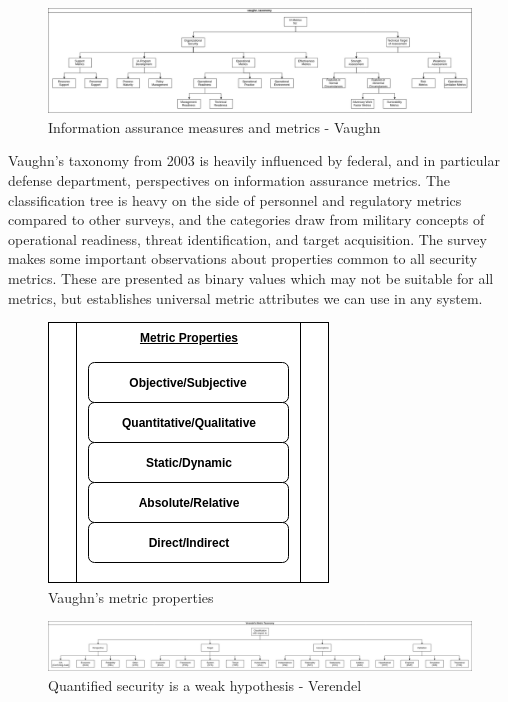 

\begin{figure}[ht]
\centering
\includegraphics[width=.95\linewidth]{resource/img/ch_background/cybok_metrics/vaughn_taxonomy.png}
\caption{Information assurance measures and metrics - Vaughn\cite{Vaughn_Henning_Siraj_2003}}
\label{fig:background:vaughn_taxonomy}
\end{figure} 

Vaughn’s taxonomy\cite{Vaughn_Henning_Siraj_2003} from 2003 is heavily influenced by federal, and in particular defense department, perspectives on information assurance metrics. The classification tree is heavy on the side of personnel and regulatory metrics compared to other surveys, and the categories draw from military concepts of operational readiness, threat identification, and target acquisition. The survey makes some important observations about properties common to all security metrics. These are presented as binary values which may not be suitable for all metrics, but establishes universal metric attributes we can use in any system.


\begin{figure}[ht]
\centering
\includegraphics[width=.35\linewidth]{resource/img/ch_background/cybok_metrics/vaughn_metric_propertie.png}
\caption{Vaughn's metric properties\cite{Vaughn_Henning_Siraj_2003}}
\label{fig:background:vaughn_metric_props}
\end{figure} 



\begin{figure}[ht]
\centering
\includegraphics[width=.95\linewidth]{resource/img/ch_background/cybok_metrics/verendel_model_taxonomy.png}
\caption{Quantified security is a weak hypothesis - Verendel \cite{Verendel_2009}}
\label{fig:background:verendel_taxonomy}
\end{figure} 

